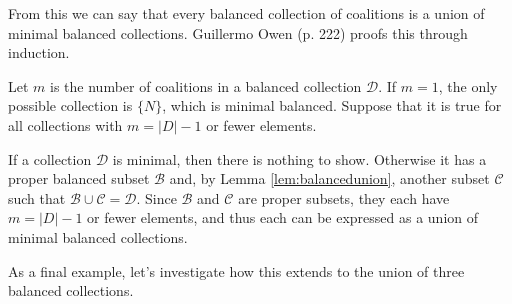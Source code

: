 \documentclass[10pt,a4paper,titlepage]{article}
\theoremstyle{plain}
\theoremstyle{definition}
\begin{document}
From this we can say that every balanced collection of coalitions is a union of minimal balanced collections. Guillermo Owen\cite{owen} (p. 222) proofs this through induction.

Let $m$ is the number of coalitions in a balanced collection $\mathcal{D}$. If $m = 1$, the only possible collection is $\{ N \}$, which is minimal balanced. Suppose that it is true for all collections with $m = |D| - 1$ or fewer elements.

If a collection $\mathcal{D}$ is minimal, then there is nothing to show. Otherwise it has a proper balanced subset $\mathcal{B}$ and, by Lemma \ref{lem:balancedunion}, another subset $\mathcal{C}$ such that $\mathcal{B} \cup \mathcal{C} = \mathcal{D}$. Since $\mathcal{B}$ and $\mathcal{C}$ are proper subsets, they each have $m = |D| - 1$ or fewer elements, and thus each can be expressed as a union of minimal balanced collections.\vspace{10pt}

As a final example, let's investigate how this extends to the union of three balanced collections.
\end{document}
